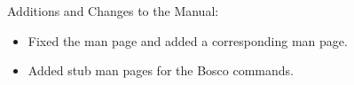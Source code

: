 \noindent Additions and Changes to the Manual:

\begin{itemize}

\item Fixed the  man page and added a corresponding
 man page.

\item Added stub man pages for the Bosco commands.

\end{itemize}


